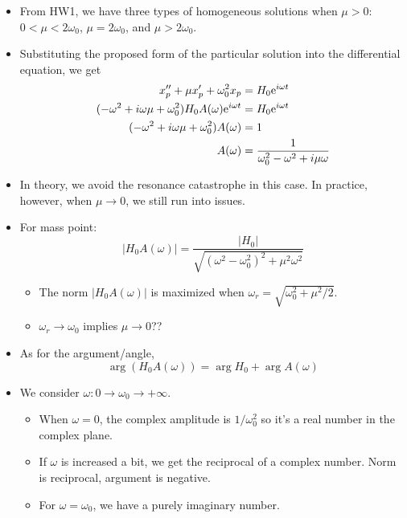 \documentclass[../notes.tex]{subfiles}
\begin{document}
\begin{itemize}
\begin{equation*}
    \end{equation*}
    \begin{itemize}
        \item From HW1, we have three types of homogeneous solutions when $\mu>0$: $0<\mu<2\omega_0$, $\mu=2\omega_0$, and $\mu>2\omega_0$.
        \item Substituting the proposed form of the particular solution into the differential equation, we get
        \begin{align*}
            x_p''+\mu x_p'+\omega_0^2x_p &= H_0\e[i\omega t]\\
            (-\omega^2+i\omega\mu+\omega_0^2)H_0A(\omega)\e[i\omega t] &= H_0\e[i\omega t]\\
            (-\omega^2+i\omega\mu+\omega_0^2)A(\omega) &= 1\\
            A(\omega) &= \frac{1}{\omega_0^2-\omega^2+i\mu\omega}
        \end{align*}
        \item In theory, we avoid the resonance catastrophe in this case. In practice, however, when $\mu\to 0$, we still run into issues.
        \item For mass point:
        \begin{equation*}
            |H_0A(\omega)| = \frac{|H_0|}{\sqrt{(\omega^2-\omega_0^2)^2+\mu^2\omega^2}}
        \end{equation*}
        \begin{itemize}
            \item The norm $|H_0A(\omega)|$ is maximized when $\omega_r=\sqrt{\omega_0^2+\mu^2/2}$.
            \item $\omega_r\to\omega_0$ implies $\mu\to 0$??
        \end{itemize}
        \item As for the argument/angle,
        \begin{equation*}
            \arg(H_0A(\omega)) = \arg H_0+\arg A(\omega)
        \end{equation*}
        \item We consider $\omega:0\to\omega_0\to+\infty$.
        \begin{itemize}
            \item When $\omega=0$, the complex amplitude is $1/\omega_0^2$ so it's a real number in the complex plane.
            \item If $\omega$ is increased a bit, we get the reciprocal of a complex number. Norm is reciprocal, argument is negative.
            \item For $\omega=\omega_0$, we have a purely imaginary number.

\end{itemize}
\end{itemize}
\end{itemize}
\end{document}
